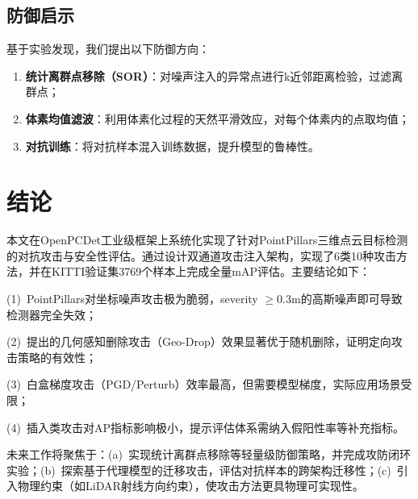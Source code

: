 ﻿\documentclass[12pt,a4paper]{ctexart}
\begin{document}
\subsection{防御启示}

基于实验发现，我们提出以下防御方向：
\begin{enumerate}
  \item \textbf{统计离群点移除（SOR）}：对噪声注入的异常点进行k近邻距离检验，过滤离群点；
  \item \textbf{体素均值滤波}：利用体素化过程的天然平滑效应，对每个体素内的点取均值；
  \item \textbf{对抗训练}：将对抗样本混入训练数据，提升模型的鲁棒性。
\end{enumerate}

\section{结论}

本文在OpenPCDet工业级框架上系统化实现了针对PointPillars三维点云目标检测的对抗攻击与安全性评估。通过设计双通道攻击注入架构，实现了6类10种攻击方法，并在KITTI验证集3769个样本上完成全量mAP评估。主要结论如下：

(1)~PointPillars对坐标噪声攻击极为脆弱，severity $\geq 0.3$m的高斯噪声即可导致检测器完全失效；

(2)~提出的几何感知删除攻击（Geo-Drop）效果显著优于随机删除，证明定向攻击策略的有效性；

(3)~白盒梯度攻击（PGD/Perturb）效率最高，但需要模型梯度，实际应用场景受限；

(4)~插入类攻击对AP指标影响极小，提示评估体系需纳入假阳性率等补充指标。

未来工作将聚焦于：(a)~实现统计离群点移除等轻量级防御策略，并完成攻防闭环实验；(b)~探索基于代理模型的迁移攻击，评估对抗样本的跨架构迁移性；(c)~引入物理约束（如LiDAR射线方向约束），使攻击方法更具物理可实现性。



\end{document}
